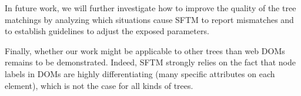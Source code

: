 In future work, we will further investigate how to improve the quality of the tree matchings by analyzing which situations cause SFTM to report mismatches and to establish guidelines to adjust the exposed parameters.

Finally, whether our work might be applicable to other trees than web DOMs remains to be demonstrated.
Indeed, SFTM strongly relies on the fact that node labels in DOMs are highly differentiating (many specific attributes on each element), which is not the case for all kinds of trees.






